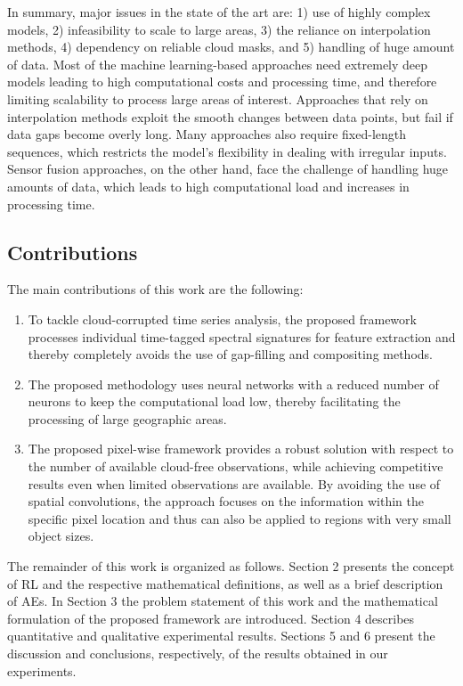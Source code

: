 \documentclass[journal,article,submit,pdftex,moreauthors]{Definitions/mdpi}
\begin{document}
In summary, major issues in the state of the art are: 1) use of highly complex models, 2) infeasibility to scale to large areas, 3) the reliance on interpolation methods, 4) dependency on reliable cloud masks, and 5) handling of huge amount of data. Most of the machine learning-based approaches need extremely deep models leading to high computational costs and processing time, and therefore limiting scalability to process large areas of interest. Approaches that rely on interpolation methods exploit the smooth changes between data points, but fail if data gaps become overly long. Many approaches also require fixed-length sequences, which restricts the model's flexibility in dealing with irregular inputs. Sensor fusion approaches, on the other hand, face the challenge of handling huge amounts of data, which leads to high computational load and increases in processing time. 

\subsection{Contributions}
The main contributions of this work are the following:
\begin{enumerate}
	\item To tackle cloud-corrupted time series analysis, the proposed framework processes individual time-tagged spectral signatures for feature extraction and thereby completely avoids the use of gap-filling and compositing methods.
	\item The proposed methodology uses neural networks with a reduced number of neurons to keep the computational load low, thereby facilitating the processing of large geographic areas.
	\item The proposed pixel-wise framework provides a robust solution with respect to the number of available cloud-free observations, while achieving competitive results even when limited observations are available. By avoiding the use of spatial convolutions, the approach focuses on the information within the specific pixel location and thus can also be applied to regions with very small object sizes. 
\end{enumerate}

The remainder of this work is organized as follows. Section 2 presents the concept of RL and the respective mathematical definitions, as well as a brief description of AEs. 
In Section 3 the problem statement of this work and the mathematical formulation of the proposed framework are introduced. 
Section 4 describes quantitative and qualitative experimental results. 
Sections 5 and 6 present the discussion and conclusions, respectively, of the results obtained in our experiments.
\end{document}
